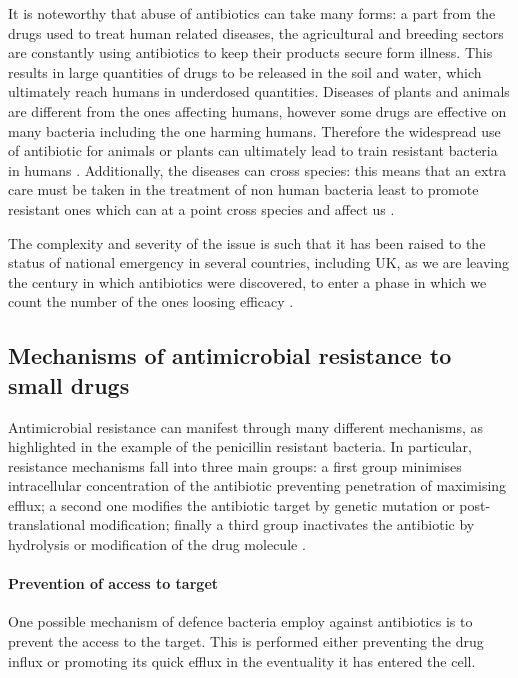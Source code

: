 It is noteworthy that abuse of antibiotics can take many forms: a part from the drugs used to treat human related diseases, the agricultural and breeding sectors are constantly using antibiotics to keep their products secure form illness. This results in large quantities of drugs to be released in the soil and water, which ultimately reach humans in underdosed quantities. Diseases of plants and animals are different from the ones affecting humans, however some drugs are effective on many bacteria including the one harming humans. Therefore the widespread use of antibiotic for animals or plants can ultimately lead to train resistant bacteria in humans \cite{????}.
%
Additionally, the diseases can cross species: this means that an extra care must be taken in the treatment of non human bacteria least to promote resistant ones which can at a point cross species and affect us \cite{????}.

The complexity and severity of the issue is such that it has been raised to the status of national emergency in several countries, including UK, as we are leaving the century in which antibiotics were discovered, to enter a phase in which we count the number of the ones loosing efficacy \cite{Oneill2016}.


\subsection{Mechanisms of antimicrobial resistance to small drugs} \label{sec:AMR_mechs}

Antimicrobial resistance can manifest through many different mechanisms, as highlighted in the example of the penicillin resistant bacteria.
%
In particular, resistance mechanisms fall into three main groups: a first group minimises intracellular concentration of the antibiotic preventing penetration of maximising efflux; a second one modifies the antibiotic target by genetic mutation or post-translational modification; finally a third group inactivates the antibiotic by hydrolysis or modification of the drug molecule \cite{Blair2014}.

\paragraph{Prevention of access to target}
One possible mechanism of defence bacteria employ against antibiotics is to prevent the access to the target. This is performed either preventing the drug influx or promoting its quick efflux in the eventuality it has entered the cell.

